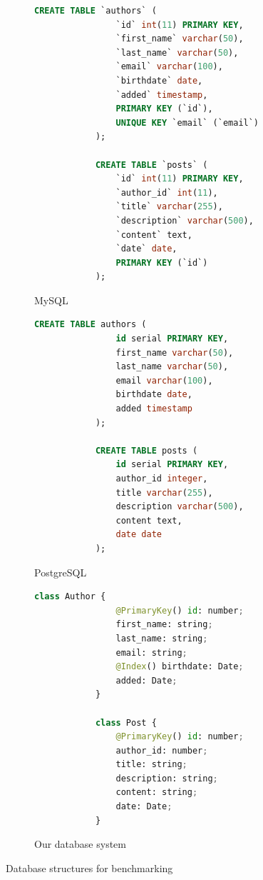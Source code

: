 \begin{figure}[h]
    \begin{subfigure}{.3\textwidth}
        \centering
        \begin{lstlisting}[language=SQL,basicstyle=\tiny]
            CREATE TABLE `authors` (
                `id` int(11) PRIMARY KEY,
                `first_name` varchar(50),
                `last_name` varchar(50),
                `email` varchar(100),
                `birthdate` date,
                `added` timestamp,
                PRIMARY KEY (`id`),
                UNIQUE KEY `email` (`email`)
            );

            CREATE TABLE `posts` (
                `id` int(11) PRIMARY KEY,
                `author_id` int(11),
                `title` varchar(255),
                `description` varchar(500),
                `content` text,
                `date` date,
                PRIMARY KEY (`id`)
            );
        \end{lstlisting}
        \caption{MySQL}
    \end{subfigure}%
    \begin{subfigure}{.3\textwidth}
        \centering
        \begin{lstlisting}[language=SQL,basicstyle=\tiny]
            CREATE TABLE authors (
                id serial PRIMARY KEY,
                first_name varchar(50),
                last_name varchar(50),
                email varchar(100),
                birthdate date,
                added timestamp
            );

            CREATE TABLE posts (
                id serial PRIMARY KEY,
                author_id integer,
                title varchar(255),
                description varchar(500),
                content text,
                date date
            );
        \end{lstlisting}
        \caption{PostgreSQL}
    \end{subfigure}
    \begin{subfigure}{.3\textwidth}
        \centering
        \begin{lstlisting}[language=python,basicstyle=\tiny]
            class Author {
                @PrimaryKey() id: number;
                first_name: string;
                last_name: string;
                email: string;
                @Index() birthdate: Date;
                added: Date;
            }

            class Post {
                @PrimaryKey() id: number;
                author_id: number;
                title: string;
                description: string;
                content: string;
                date: Date;
            }
        \end{lstlisting}
        \caption{Our database system}
    \end{subfigure}
    \caption{Database structures for benchmarking}
    \label{benchDatabaseStructure}
\end{figure}


